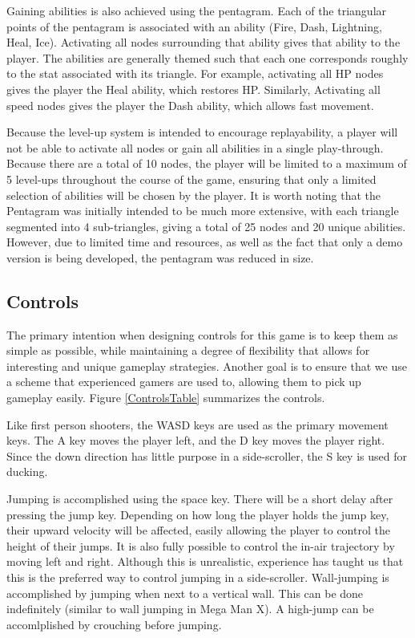 \documentclass{article}
\begin{document}
Gaining abilities is also achieved using the pentagram.  Each of the triangular points of the pentagram is associated with an ability (Fire, Dash, Lightning, Heal, Ice).  Activating all nodes surrounding that ability gives that ability to the player.  The abilities are generally themed such that each one corresponds roughly to the stat associated with its triangle.  For example, activating all HP nodes gives the player the Heal ability, which restores HP.  Similarly, Activating all speed nodes gives the player the Dash ability, which allows fast movement.

Because the level-up system is intended to encourage replayability, a player will not be able to activate all nodes or gain all abilities in a single play-through.  Because there are a total of 10 nodes, the player will be limited to a maximum of 5 level-ups throughout the course of the game, ensuring that only a limited selection of abilities will be chosen by the player.  It is worth noting that the Pentagram was initially intended to be much more extensive, with each triangle segmented into 4 sub-triangles, giving a total of 25 nodes and 20 unique abilities.  However, due to limited time and resources, as well as the fact that only a demo version is being developed, the pentagram was reduced in size.

\subsection{Controls}

The primary intention when designing controls for this game is to keep them as simple as possible, while maintaining a degree of flexibility that allows for interesting and unique gameplay strategies.  Another goal is to ensure that we use a scheme that experienced gamers are used to, allowing them to pick up gameplay easily.  Figure \ref{ControlsTable} summarizes the controls.

Like first person shooters, the WASD keys are used as the primary movement keys.  The A key moves the player left, and the D key moves the player right.  Since the down direction has little purpose in a side-scroller, the S key is used for ducking.

Jumping is accomplished using the space key.  There will be a short delay after pressing the jump key.  Depending on how long the player holds the jump key, their upward velocity will be affected, easily allowing the player to control the height of their jumps.  It is also fully possible to control the in-air trajectory by moving left and right.  Although this is unrealistic, experience has taught us that this is the preferred way to control jumping in a side-scroller.  Wall-jumping is accomplished by jumping when next to a vertical wall.  This can be done indefinitely (similar to wall jumping in Mega Man X).  A high-jump can be accomlplished by crouching before jumping.
\end{document}
